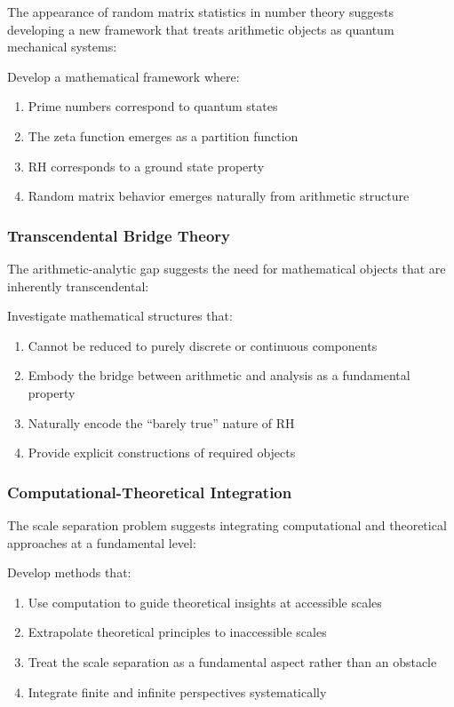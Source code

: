 The appearance of random matrix statistics in number theory suggests developing a new framework that treats arithmetic objects as quantum mechanical systems:

\begin{research_direction}
Develop a mathematical framework where:
\begin{enumerate}
\item Prime numbers correspond to quantum states
\item The zeta function emerges as a partition function
\item RH corresponds to a ground state property
\item Random matrix behavior emerges naturally from arithmetic structure
\end{enumerate}
\end{research_direction}

\subsubsection{Transcendental Bridge Theory}
\label{subsubsec:bridge_theory}

The arithmetic-analytic gap suggests the need for mathematical objects that are inherently transcendental:

\begin{research_direction}
Investigate mathematical structures that:
\begin{enumerate}
\item Cannot be reduced to purely discrete or continuous components
\item Embody the bridge between arithmetic and analysis as a fundamental property
\item Naturally encode the ``barely true'' nature of RH
\item Provide explicit constructions of required objects
\end{enumerate}
\end{research_direction}

\subsubsection{Computational-Theoretical Integration}
\label{subsubsec:computational_theoretical}

The scale separation problem suggests integrating computational and theoretical approaches at a fundamental level:

\begin{research_direction}
Develop methods that:
\begin{enumerate}
\item Use computation to guide theoretical insights at accessible scales
\item Extrapolate theoretical principles to inaccessible scales
\item Treat the scale separation as a fundamental aspect rather than an obstacle
\item Integrate finite and infinite perspectives systematically
\end{enumerate}
\end{research_direction}


